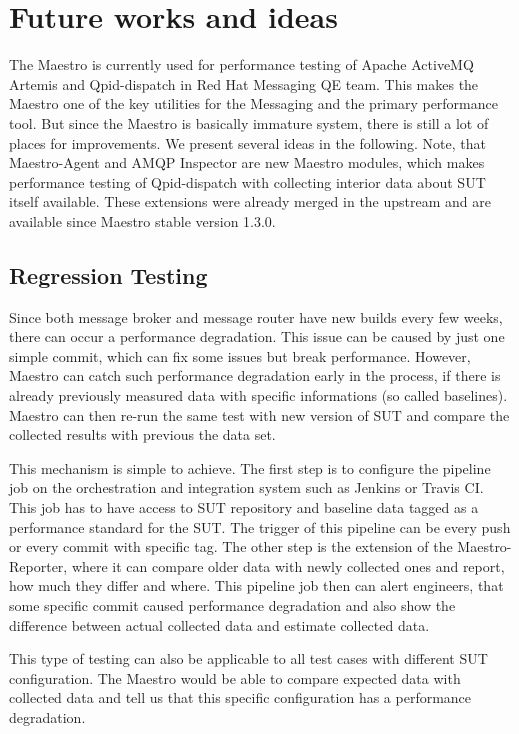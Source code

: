 
\chapter{Future works and ideas}
\label{Future works and ideas}
The Maestro is currently used for performance testing of Apache ActiveMQ Artemis and Qpid-dispatch in Red Hat Messaging QE team. This makes the Maestro one of the key utilities for the Messaging and the primary performance tool. But since the Maestro is basically immature system, there is still a lot of places for improvements. We present several ideas in the following. Note, that Maestro-Agent and AMQP Inspector are new Maestro modules, which makes performance testing of Qpid-dispatch with collecting interior data about SUT itself available. These extensions were already merged in the upstream and are available since Maestro stable version 1.3.0.

\section{Regression Testing}
Since both message broker and message router have new builds every few weeks, there can occur a performance degradation. This issue can be caused by just one simple commit, which can fix some issues but break performance. However, Maestro can catch such performance degradation early in the process, if there is already previously measured data with specific informations (so called baselines). Maestro can then re-run the same test with new version of SUT and compare the collected results with previous the data set.

This mechanism is simple to achieve. The first step is to configure the pipeline job on the orchestration and integration system such as Jenkins or Travis CI. This job has to have access to SUT repository and baseline data tagged as a performance standard for the SUT. The trigger of this pipeline can be every push or every commit with specific tag. The other step is the extension of the Maestro-Reporter, where it can compare older data with newly collected ones and report, how much they differ and where. This pipeline job then can alert engineers, that some specific commit caused performance degradation and also show the difference between actual collected data and estimate collected data.

This type of testing can also be applicable to all test cases with different SUT configuration. The Maestro would be able to compare expected data with collected data and tell us that this specific configuration has a performance degradation.

